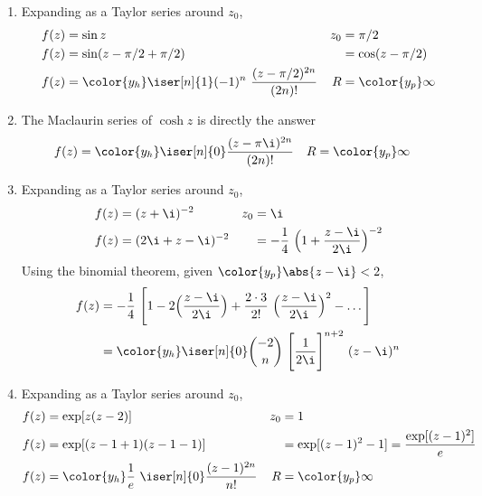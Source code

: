 \begin{enumerate}
    \item Expanding as a Taylor series around $ z_0 $,
          \begin{align}
              f(z)    & = \sin z                                                    &
              z_0     & = \pi/2                                                       \\
              f(z)    & = \sin(z - \pi/2 + \pi/2)                                   &
                      & = \cos(z - \pi/2)                                             \\
              f(z)    & = \color{y_h} \iser[n]{1} (-1)^{n}\ \frac{(z - \pi/2)^{2n}}
              {(2n)!} &
              R       & = \color{y_p} \infty
          \end{align}

    \item The Maclaurin series of $ \cosh z $ is directly the answer
          \begin{align}
              f(z) & = \color{y_h}  \iser[n]{0} \frac{(z - \pi \i)^{2n}}{(2n)!} &
              R    & = \color{y_p} \infty
          \end{align}

    \item Expanding as a Taylor series around $ z_0 $,
          \begin{align}
              f(z) & = (z + \i)^{-2}                                         &
              z_0  & = \i                                                      \\
              f(z) & = (2\i + z - \i)^{-2}                                   &
                   & = -\frac{1}{4}\ \Big( 1 + \frac{z - \i}{2\i} \Big)^{-2}
          \end{align}
          Using the binomial theorem, given $\color{y_p} \abs{z - \i} < 2 $,
          \begin{align}
              f(z) & = -\frac{1}{4}\ \Bigg[ 1 - 2\Big( \frac{z - \i}{2\i} \Big)
                  + \frac{2 \cdot 3 }{2!}\ \Big( \frac{z - \i}{2\i} \Big)^2
              - \dots \Bigg]                                                      \\
                   & = \color{y_h} \iser[n]{0} \binom{-2}{n}\ \Bigg[\frac{1}{2\i}
                  \Bigg]^{n+2}\ (z - \i)^n
          \end{align}

    \item Expanding as a Taylor series around $ z_0 $,
          \begin{align}
              f(z) & = \exp[z(z-2)]                                               &
              z_0  & = 1                                                            \\
              f(z) & = \exp[(z-1 + 1)(z-1 - 1)]                                   &
                   & = \exp[(z-1)^2 - 1] = \frac{\exp[(z-1)^2]}{e}                  \\
              f(z) & = \color{y_h} \frac{1}{e}\ \iser[n]{0} \frac{(z-1)^{2n}}{n!} &
              R    & = \color{y_p} \infty
          \end{align}


\end{enumerate}
